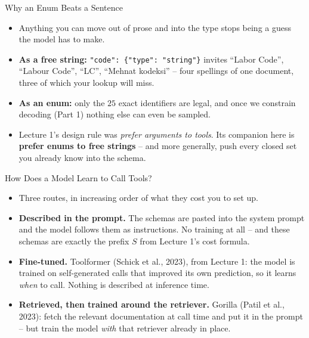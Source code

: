 \begin{frame}{Why an Enum Beats a Sentence}
\begin{itemize}
  \item Anything you can move out of prose and into the type stops being a guess the model has to make.
  \pause
  \item \textbf{As a free string:} \texttt{"code": \{"type": "string"\}} invites ``Labor Code'', ``Labour Code'', ``LC'', ``Mehnat kodeksi'' -- four spellings of one document, three of which your lookup will miss.
  \pause
  \item \textbf{As an enum:} only the $25$ exact identifiers are legal, and once we constrain decoding (Part 1) nothing else can even be sampled.
  \pause
  \item Lecture 1's design rule was \emph{prefer arguments to tools}. Its companion here is \textbf{prefer enums to free strings} -- and more generally, push every closed set you already know into the schema.
\end{itemize}
\end{frame}

\begin{frame}{How Does a Model Learn to Call Tools?}
\begin{itemize}
  \item Three routes, in increasing order of what they cost you to set up.
  \pause
  \item \textbf{Described in the prompt.} The schemas are pasted into the system prompt and the model follows them as instructions. No training at all -- and these schemas are exactly the prefix $S$ from Lecture 1's cost formula.
  \pause
  \item \textbf{Fine-tuned.} Toolformer (Schick et al., 2023), from Lecture 1: the model is trained on self-generated calls that improved its own prediction, so it learns \emph{when} to call. Nothing is described at inference time.
  \pause
  \item \textbf{Retrieved, then trained around the retriever.} Gorilla (Patil et al., 2023): fetch the relevant documentation at call time and put it in the prompt -- but train the model \emph{with} that retriever already in place.
\end{itemize}
\end{frame}

